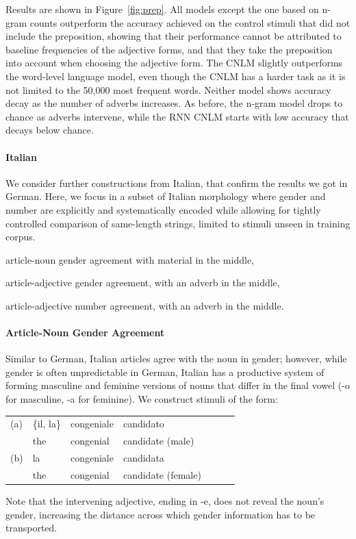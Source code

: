 Results are shown in Figure~\ref{fig:prep}.
All models except the one based on n-gram counts outperform the accuracy achieved on the control stimuli that did not include the preposition, showing that their performance cannot be attributed to baseline frequencies of the adjective forms, and that they take the preposition into account when choosing the adjective form.
The CNLM slightly outperforms the word-level language model, even though the CNLM has a harder task as it is not limited to the 50,000 most frequent words.
Neither model shows accuracy decay as the number of adverbs increases.
As before, the n-gram model drops to chance as adverbs intervene, while the RNN CNLM starts with low accuracy that decays below chance.

\paragraph{Italian} We consider further constructions from Italian,
that confirm the results we got in German.
Here, we focus in a  subset of Italian morphology where gender and number are explicitly and systematically
encoded while allowing for tightly controlled comparison of
same-length strings, limited to stimuli unseen in training corpus.
\begin{inparaenum}[i)]
\item article-noun gender agreement with material in the middle,
\item article-adjective gender agreement, with an adverb in the middle,
\item article-adjective number agreement, with an adverb in the middle.
\end{inparaenum}

\paragraph{Article-Noun Gender Agreement}

Similar to German, Italian articles agree with the noun in gender; however, while gender is often unpredictable in German, Italian has a productive system of forming masculine and feminine versions of nouns that differ in the final vowel (-o for masculine, -a for feminine).
We construct stimuli of the form:
\begin{tabular}{lllllll}
(a) & \{il, la\} & congeniale & candidato \\
   &  the & congenial & candidate (male) \\
(b) & la & congeniale & candidata \\
    &the & congenial & candidate (female) \\
\end{tabular}
Note that the intervening adjective, ending in -e, does not reveal the noun's gender, increasing the distance across which gender information has to be transported.

